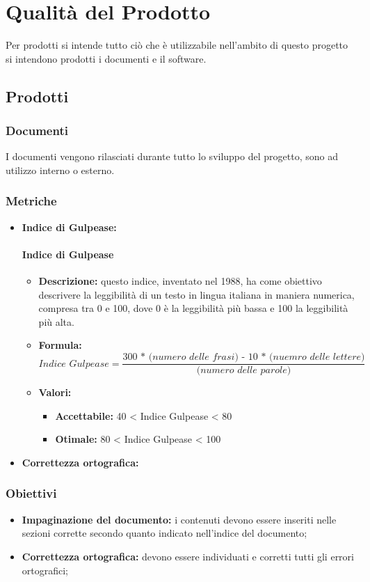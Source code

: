 \section{Qualità del Prodotto}
Per prodotti si intende tutto ciò che è utilizzabile nell'ambito di questo progetto si intendono prodotti i documenti e il software.

\subsection{Prodotti}
\subsubsection{Documenti}
I documenti vengono rilasciati durante tutto lo sviluppo del progetto, sono ad utilizzo interno o esterno.

\subsubsection{Metriche}
\begin{itemize}
    \item \textbf{Indice di Gulpease:}
    \paragraph{Indice di Gulpease}
\begin{itemize}
\item \textbf{Descrizione:} questo indice, inventato nel 1988, ha come obiettivo descrivere la leggibilità di un testo in lingua italiana in maniera numerica, compresa tra 0 e 100, dove 0 è la leggibilità più bassa e 100 la leggibilità più alta. 
\item \textbf{Formula:} \[\textit{Indice Gulpease} = \frac{\textit{300 * (numero delle frasi) - 10 * (nuemro delle lettere)}}{\textit{(numero delle parole)}}\]
\item \textbf{Valori:}
    \begin{itemize}
        \item \textbf{Accettabile:} 40 < Indice Gulpease < 80
        \item \textbf{Otimale:} 80 < Indice Gulpease < 100
    \end{itemize}
\end{itemize}
    \item \textbf{Correttezza ortografica:}
\end{itemize}

\subsubsection{Obiettivi}
\begin{itemize}
    \item \textbf{Impaginazione del documento:} i contenuti devono essere inseriti nelle sezioni corrette secondo quanto indicato nell'indice del documento;
    \item \textbf{Correttezza ortografica:} devono essere individuati e corretti tutti gli errori ortografici;
\end{itemize}

